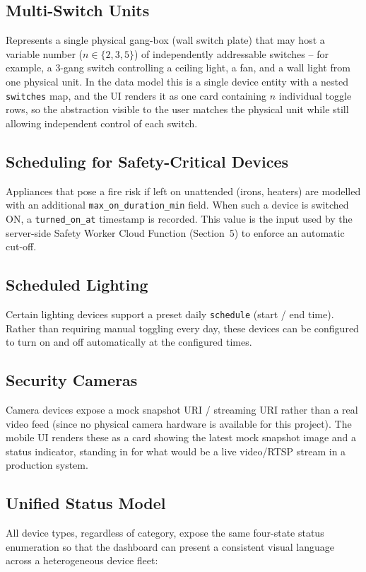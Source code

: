 \documentclass[11pt,a4paper]{article}
\begin{document}
\subsection{Multi-Switch Units}
Represents a single physical gang-box (wall switch plate) that may host a variable number ($n \in \{2, 3, 5\}$) of independently addressable switches -- for example, a 3-gang switch controlling a ceiling light, a fan, and a wall light from one physical unit. In the data model this is a single device entity with a nested \texttt{switches} map, and the UI renders it as one card containing $n$ individual toggle rows, so the abstraction visible to the user matches the physical unit while still allowing independent control of each switch.

\subsection{Scheduling for Safety-Critical Devices}
Appliances that pose a fire risk if left on unattended (irons, heaters) are modelled with an additional \texttt{max\_on\_duration\_min} field. When such a device is switched ON, a \texttt{turned\_on\_at} timestamp is recorded. This value is the input used by the server-side Safety Worker Cloud Function (Section~5) to enforce an automatic cut-off.

\subsection{Scheduled Lighting}
Certain lighting devices support a preset daily \texttt{schedule} (start / end time). Rather than requiring manual toggling every day, these devices can be configured to turn on and off automatically at the configured times.

\subsection{Security Cameras}
Camera devices expose a mock snapshot URI / streaming URI rather than a real video feed (since no physical camera hardware is available for this project). The mobile UI renders these as a card showing the latest mock snapshot image and a status indicator, standing in for what would be a live video/RTSP stream in a production system.

\subsection{Unified Status Model}
All device types, regardless of category, expose the same four-state status enumeration so that the dashboard can present a consistent visual language across a heterogeneous device fleet:
\end{document}
